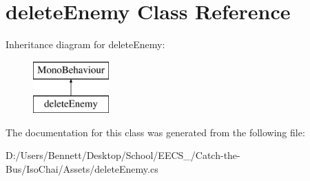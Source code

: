 \hypertarget{classdelete_enemy}{}\section{delete\+Enemy Class Reference}
\label{classdelete_enemy}
Inheritance diagram for delete\+Enemy\+:\begin{figure}[H]
\begin{center}
\leavevmode
\includegraphics[height=2.000000cm]{classdelete_enemy}
\end{center}
\end{figure}


The documentation for this class was generated from the following file\+:\begin{DoxyCompactItemize}
\item 
D\+:/\+Users/\+Bennett/\+Desktop/\+School/\+E\+E\+C\+S\+\_/\+Catch-\/the-\/\+Bus/\+Iso\+Chai/\+Assets/delete\+Enemy.\+cs\end{DoxyCompactItemize}
